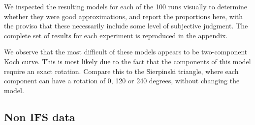 We inspected the resulting models for each of the 100 runs visually to determine whether they were good approximations, and report the proportions here, with the proviso that these necessarily include some level of subjective judgment. The complete set of results for each experiment is reproduced in the appendix. 

We observe that the most difficult of these models appears to be two-component Koch curve. This is most likely due to the fact that the components of this model require an exact rotation. Compare this to the Sierpinski triangle, where each component can have a rotation of 0, 120 or 240 degrees, without changing the model.

\subsection{Non IFS data}

